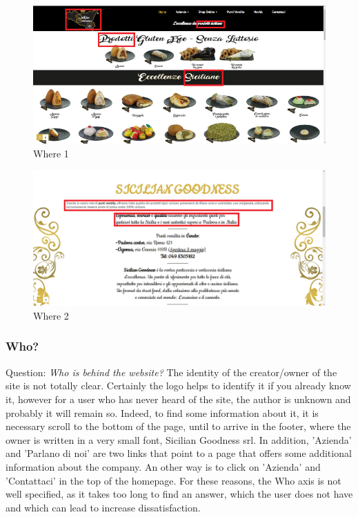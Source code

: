 \begin{figure}[H]
	\centering\includegraphics[width=12cm]{Img/where1.png}
	\caption{Where 1}
\end{figure}

\begin{figure}[H]
	\centering\includegraphics[width=12cm]{Img/where2.png}
	\caption{Where 2}
\end{figure}

\pagebreak

\subsubsection{Who?}

Question: \textit{Who is behind the website?}
\newline
The identity of the creator/owner of the site is not totally clear. Certainly the logo helps to identify it if you already know it, however for a user who has never heard of the site, the author is unknown and probably it will remain so. Indeed, to find some information about it, it is necessary scroll to the bottom of the page, until
to arrive in the footer, where the owner is written in a very small font, Sicilian Goodness srl. In addition, 'Azienda' and 'Parlano di noi' are two links that point to a page that offers some additional information about the company.
An other way is to click on 'Azienda' and 'Contattaci' in the top of the homepage. For these reasons, the Who axis is not well specified, as it takes too long to find an answer, which the user does not have and which can lead to increase dissatisfaction.

